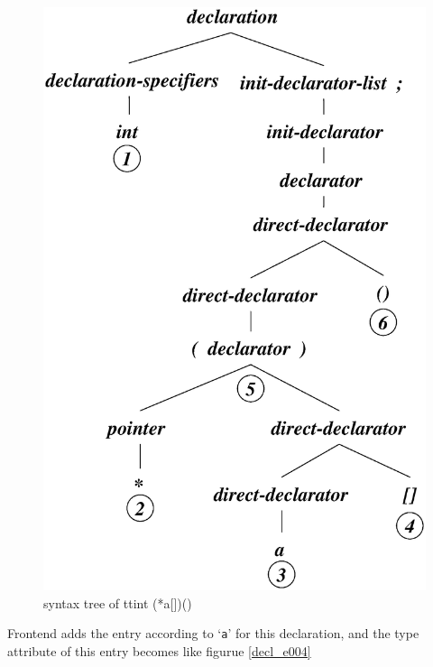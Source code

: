 \begin{figure}[htbp]
\begin{center}
\begin{latexonly}
\includegraphics[width=1.0125\linewidth,height=1.4175\linewidth]{decl003.eps}
\end{latexonly}
\caption{syntax tree of {tt{int (*a[])()}}}
\label{decl_e003}
\end{center}
\end{figure}
 Frontend adds the entry according to `{\tt{a}}'
for this declaration, and the type attribute of this entry becomes
like figurue \ref{decl_e004}
